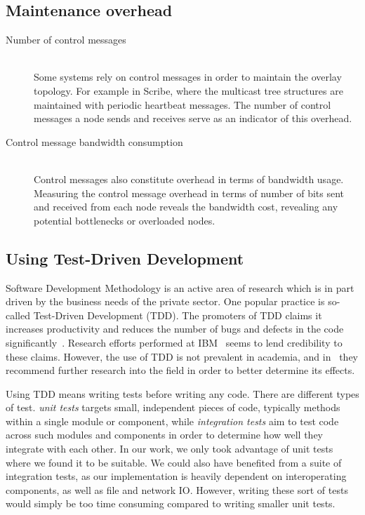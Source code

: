 \subsection{Maintenance overhead}

\begin{description}
\item[Number of control messages]\hfill\\

Some systems rely on control messages in order to maintain the overlay
topology. For example in Scribe, where the multicast tree structures are
maintained with periodic heartbeat messages. The number of control
messages a node sends and receives serve as an indicator of this
overhead.

\item[Control message bandwidth consumption]\hfill\\

Control messages also constitute overhead in terms of bandwidth usage.
Measuring the control message overhead in terms of number of bits sent
and received from each node reveals the bandwidth cost, revealing any
potential bottlenecks or overloaded nodes.

\end{description}

\clearpage
\subsection{Using Test-Driven Development}

Software Development Methodology is an active area of research
which is in part driven by the business needs of the private
sector\cite{janzen2005test}. One popular practice is so-called Test-Driven
Development (TDD). The promoters of TDD claims it increases
productivity and reduces the number of bugs and defects in the
code significantly~\cite{beck2003test}. Research
efforts performed at IBM~\cite{maximilien2003assessing} seems to
lend credibility to these claims. However, the use of TDD is not
prevalent in academia, and in~\cite{janzen2005test} they
recommend further research into the field in order to better
determine its effects.

Using TDD means writing tests before writing any code. There are
different types of test. \emph{unit tests} targets small,
independent pieces of code, typically methods within a single
module or component, while \emph{integration tests} aim to test
code across such modules and components in order to determine
how well they integrate with each other. In our work, we only
took advantage of unit tests where we found it to be suitable.
We could also have benefited from a suite of integration tests,
as our implementation is heavily dependent on interoperating
components, as well as file and network IO\@. However, writing
these sort of tests would simply be too time consuming compared
to writing smaller unit tests.

